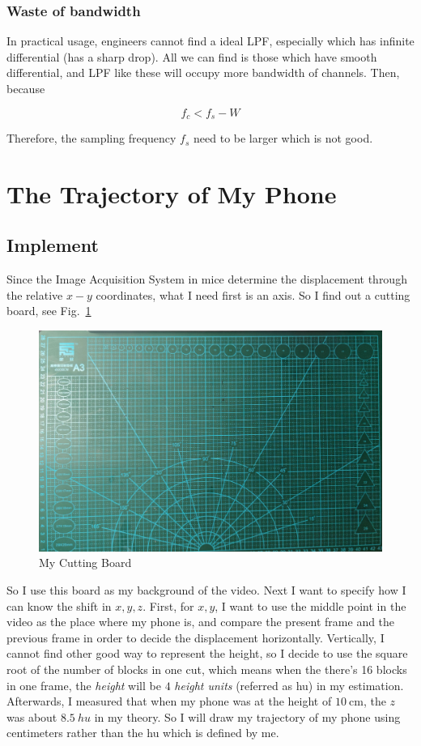 \documentclass{article}
\begin{document}
\subsubsection*{Waste of bandwidth}
In practical usage, engineers cannot find a ideal LPF, especially which has infinite differential (has a sharp drop). All we can find is those which have smooth differential, and LPF like these will occupy more bandwidth of channels. Then, because

$$
f_c < f_s - W
$$

Therefore, the sampling frequency $f_s$ need to be larger which is not good.

\section{The Trajectory of My Phone}

\subsection{Implement}
Since the Image Acquisition System in mice determine the displacement through the relative $x-y$ coordinates, what I need first is an axis. So I find out a cutting board, see Fig.~\ref{fig:cuttingBoard}

\begin{figure}[!h]
	\centering
	\includegraphics[width=5 in]{../pic/cuttingBoard.jpg}
	\caption{My Cutting Board}
	\label{fig:cuttingBoard}
\end{figure}

So I use this board as my background of the video. Next I want to specify how I can know the shift in $x, y, z$. First, for $x, y$, I want to use the middle point in the video as the place where my phone is, and compare the present frame and the previous frame in order to decide the displacement horizontally. Vertically, I cannot find other good way to represent the height, so I decide to use the square root of the number of blocks in one cut, which means when the there's 16 blocks in one frame, the \emph{height} will be $4$ \emph{height units} (referred as hu) in my estimation. Afterwards, I measured that when my phone was at the height of $10~ \mathrm{cm}$, the $z$ was about $8.5 \mathrm~{hu}$ in my theory. So I will draw my trajectory of my phone using centimeters rather than the hu which is defined by me.  
\end{document}
